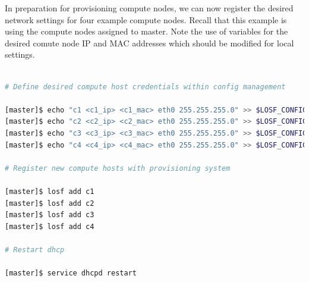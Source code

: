 \documentclass[letterpaper]{article}
\begin{document}





In preparation for provisioning compute nodes, we can now register the desired
network settings for four example compute nodes. Recall that this example is
using the compute nodes assigned to master. Note the use of variables for the
desired comute node IP and MAC addresses which should be modified for local
settings. 

\vspace*{0.2cm}

\begin{lstlisting}[language=bash,keywords={},upquote=true,basicstyle=\footnotesize\ttfamily]

# Define desired compute host credentials within config management

[master]$ echo "c1 <c1_ip> <c1_mac> eth0 255.255.255.0" >> $LOSF_CONFIG_DIR/ips.cluster
[master]$ echo "c2 <c2_ip> <c2_mac> eth0 255.255.255.0" >> $LOSF_CONFIG_DIR/ips.cluster
[master]$ echo "c3 <c3_ip> <c3_mac> eth0 255.255.255.0" >> $LOSF_CONFIG_DIR/ips.cluster
[master]$ echo "c4 <c4_ip> <c4_mac> eth0 255.255.255.0" >> $LOSF_CONFIG_DIR/ips.cluster

# Register new compute hosts with provisioning system

[master]$ losf add c1
[master]$ losf add c2
[master]$ losf add c3
[master]$ losf add c4

# Restart dhcp 

[master]$ service dhcpd restart

\end{lstlisting}
\end{document}
